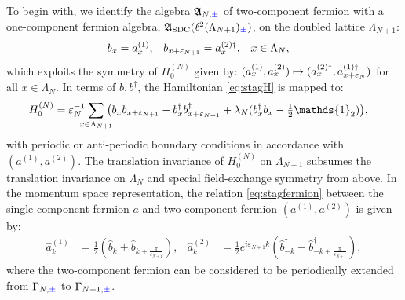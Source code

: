\documentclass[a4paper, 11pt]{article}
\newcommand{\fA}{\mathfrak{A}}\newcommand{\cA}{\mathcal{A}}\newcommand{\dA}{\mathds{A}}\newcommand{\sA}{\mathscr{A}}
\newcommand{\ltwo}{\ell^{2}}
\DeclareMathOperator{\1}{\mathds{1}}
\DeclareMathOperator{\SDC}{\textup{SDC}}
\begin{document}
To begin with, we identify the algebra $\fA_{N,{\color{blue}\pm}}$ of two-component fermion with a one-component fermion algebra, $\fA_{\SDC}(\ltwo(\Lambda_{N+1})_{{\color{blue}\pm}})$, on the doubled lattice $\Lambda_{N+1}$:
\begin{align}
\label{eq:stagfermion}
b_{x} & = a^{(1)}_{x}, & b_{x+\varepsilon_{N+1}} & = a^{(2)\dag}_{x}, & x & \in\Lambda_{N},
\end{align}
which exploits the symmetry of $H^{(N)}_{0}$ given by: $(a^{(1)}_{x},a^{(2)}_{x})\mapsto(a^{(2)\dag}_{x}, a^{(1)\dag}_{x+\varepsilon_{N}})$ for all $x\in\Lambda_{N}$. In terms of $b, b^{\dag}$, the Hamiltonian \eqref{eq:stagH} is mapped to:
\begin{align}
\label{eq:stagH1c}
H^{(N)}_{0} & = \vep_{N}^{-1}\hspace{-0.25cm}\sum_{x\in\Lambda_{N+1}}\hspace{-0.25cm}\big(b_{x}b_{x+\vep_{N+1}}-b^{\dag}_{x}b^{\dag}_{x+\vep_{N+1}}+\lambda_{N}(b^{\dag}_{x}b_{x}-\tfrac{1}{2}\mathds{1}_{2})\big),
\end{align}
with periodic or anti-periodic boundary conditions in accordance with $(a^{(1)},a^{(2)})$. The translation invariance of $H^{(N)}_{0}$ on $\Lambda_{N+1}$ subsumes the translation invariance on $\Lambda_{N}$ and special field-exchange symmetry from above. In the momentum space representation, the relation \eqref{eq:stagfermion} between the single-component fermion $a$ and two-component fermion $(a^{(1)},a^{(2)})$ is given by:
\begin{align}
\label{eq:stagfermionfourier}
\hat{a}^{(1)}_{k} & = \tfrac{1}{2}(\hat{b}_{k}+\hat{b}_{k+\frac{\pi}{\varepsilon_{N+1}}}), & \hat{a}^{(2)}_{k} & = \tfrac{1}{2}e^{i\varepsilon_{N+1}k}(\hat{b}^{\dag}_{-k}-\hat{b}^{\dag}_{-k+\frac{\pi}{\varepsilon_{N+1}}}),
\end{align}
where the two-component fermion can be considered to be periodically extended from $\Gamma_{N,{\color{blue}\pm}}$ to $\Gamma_{N+1,{\color{blue}\pm}}$.

\bigskip
\end{document}
